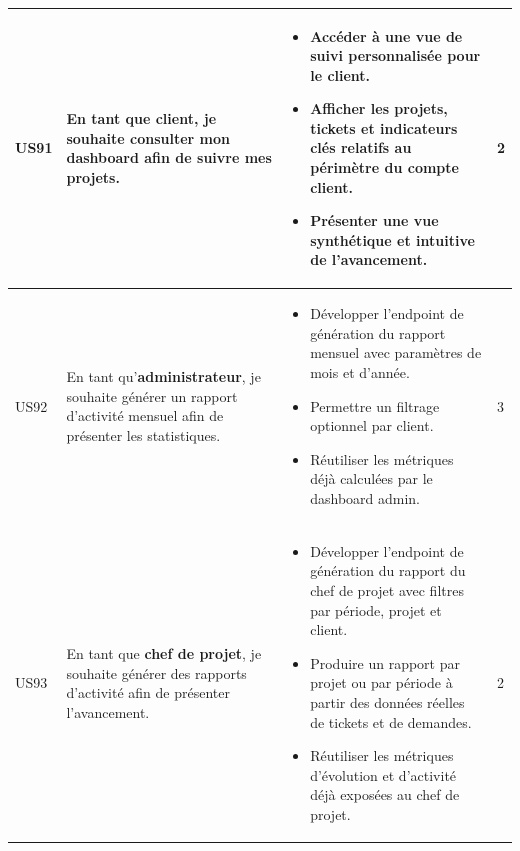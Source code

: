 \begin{longtable}{|C{1cm}|L{5.6cm}|L{8cm}|C{0.85cm}|}
US91 & En tant que \textbf{client}, je souhaite consulter mon dashboard afin de suivre mes projets. &
\begin{itemize}[nosep, left=0pt, label={$\bullet$}]
\item Accéder à une vue de suivi personnalisée pour le client.
\item Afficher les projets, tickets et indicateurs clés relatifs au périmètre du compte client.
\item Présenter une vue synthétique et intuitive de l'avancement.
\end{itemize} & 2 \\
\hline

US92 & En tant qu'\textbf{administrateur}, je souhaite générer un rapport d'activité mensuel afin de présenter les statistiques. &
\begin{itemize}[nosep, left=0pt, label={$\bullet$}]
\item Développer l'endpoint de génération du rapport mensuel avec paramètres de mois et d'année.
\item Permettre un filtrage optionnel par client.
\item Réutiliser les métriques déjà calculées par le dashboard admin.
\end{itemize} & 3 \\
\hline

US93 & En tant que \textbf{chef de projet}, je souhaite générer des rapports d'activité afin de présenter l'avancement. &
\begin{itemize}[nosep, left=0pt, label={$\bullet$}]
\item Développer l'endpoint de génération du rapport du chef de projet avec filtres par période, projet et client.
\item Produire un rapport par projet ou par période à partir des données réelles de tickets et de demandes.
\item Réutiliser les métriques d'évolution et d'activité déjà exposées au chef de projet.
\end{itemize} & 2 \\
\hline

\end{longtable}
\label{tab:backlog_sprint4}
